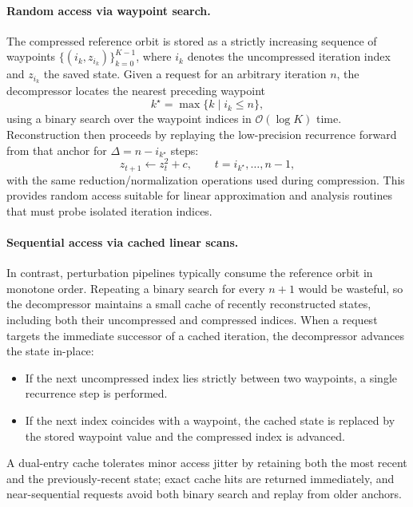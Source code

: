 \paragraph{Random access via waypoint search.}
The compressed reference orbit is stored as a strictly increasing sequence of
waypoints
\(
\{(i_k, z_{i_k})\}_{k=0}^{K-1}
\),
where \(i_k\) denotes the uncompressed iteration index and \(z_{i_k}\) the saved
state.  Given a request for an arbitrary iteration \(n\), the decompressor locates the nearest
preceding waypoint
\begin{equation}
  k^\star = \max\{k \mid i_k \le n\},
  \label{eq:waypoint-search}
\end{equation}
using a binary search over the waypoint indices in
\(\mathcal{O}(\log K)\) time.  Reconstruction then proceeds by replaying the
low-precision recurrence forward from that anchor for
\(\Delta = n - i_{k^\star}\) steps:
\begin{equation}
  z_{t+1} \leftarrow z_t^2 + c,
  \qquad t = i_{k^\star}, \dots, n-1,
  \label{eq:replay-recurrence}
\end{equation}
with the same reduction/normalization operations used during compression.  This
provides random access suitable for linear approximation
and analysis routines that must probe isolated iteration indices.

\paragraph{Sequential access via cached linear scans.}
In contrast, perturbation pipelines typically consume the reference orbit in
monotone order.  Repeating a binary search for every \(n+1\) would be wasteful,
so the decompressor maintains a small cache of recently reconstructed states,
including both their uncompressed and compressed indices.  When a request
targets the immediate successor of a cached iteration, the decompressor advances
the state in-place:
\begin{itemize}
  \item If the next uncompressed index lies strictly between two waypoints, a
        single recurrence step is performed.
  \item If the next index coincides with a waypoint, the cached state is replaced
        by the stored waypoint value and the compressed index is advanced.
\end{itemize}
A dual-entry cache tolerates minor access jitter by retaining both the most
recent and the previously-recent state; exact cache hits are returned
immediately, and near-sequential requests avoid both binary search and replay
from older anchors.

